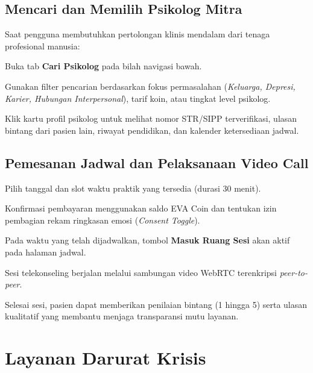 \subsection{Mencari dan Memilih Psikolog Mitra}
Saat pengguna membutuhkan pertolongan klinis mendalam dari tenaga profesional manusia:
\begin{steplist}
  \item Buka tab \textbf{Cari Psikolog} pada bilah navigasi bawah.
  \item Gunakan filter pencarian berdasarkan fokus permasalahan (\textit{Keluarga, Depresi, Karier, Hubungan Interpersonal}), tarif koin, atau tingkat level psikolog.
  \item Klik kartu profil psikolog untuk melihat nomor STR/SIPP terverifikasi, ulasan bintang dari pasien lain, riwayat pendidikan, dan kalender ketersediaan jadwal.
\end{steplist}

\subsection{Pemesanan Jadwal dan Pelaksanaan Video Call}
\begin{steplist}
  \item Pilih tanggal dan slot waktu praktik yang tersedia (durasi 30 menit).
  \item Konfirmasi pembayaran menggunakan saldo EVA Coin dan tentukan izin pembagian rekam ringkasan emosi (\textit{Consent Toggle}).
  \item Pada waktu yang telah dijadwalkan, tombol \textbf{Masuk Ruang Sesi} akan aktif pada halaman jadwal.
  \item Sesi telekonseling berjalan melalui sambungan video WebRTC terenkripsi \textit{peer-to-peer}.
  \item Selesai sesi, pasien dapat memberikan penilaian bintang (1 hingga 5) serta ulasan kualitatif yang membantu menjaga transparansi mutu layanan.
\end{steplist}

\section{Layanan Darurat Krisis}

